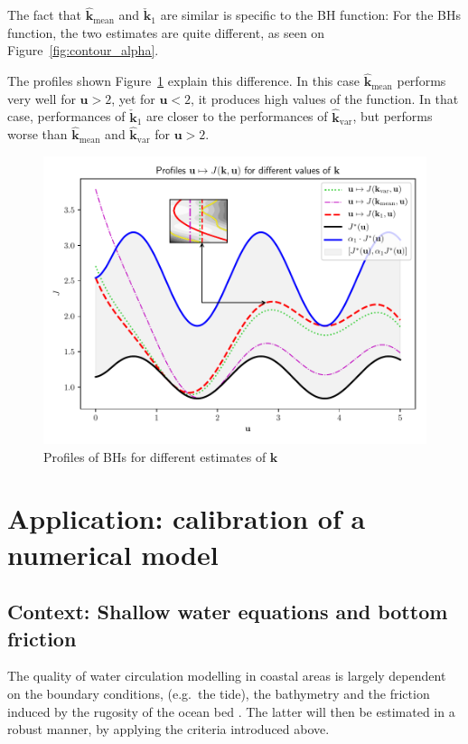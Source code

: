 \documentclass[npg, manuscript]{copernicus}
\begin{document}
The fact that $\hat{\mathbf{k}}_{\mathrm{mean}}$ and $\check{\mathbf{k}}_1$ are similar is specific to the BH function:
For the BHs function, the two estimates are quite different, as seen on Figure~\ref{fig:contour_alpha}.

The profiles shown Figure~\ref{fig:profiles_branin_switch} explain this difference. In this case $\hat{\mathbf{k}}_{\mathrm{mean}}$ performs very well for $\mathbf{u}>2$, yet for $\mathbf{u}<2$, it produces high values of the function. In that case, performances of $\check{\mathbf{k}}_1$ are closer to the performances of $\hat{\mathbf{k}}_{\mathrm{var}}$, but performs worse than $\hat{\mathbf{k}}_{\mathrm{mean}}$ and $\hat{\mathbf{k}}_{\mathrm{var}}$ for $\mathbf{u}>2$.

\begin{figure}[t]
\includegraphics[width=12cm]{Figures/profile_branin_switch.pdf}
\caption{Profiles of BHs for different estimates of $\mathbf{k}$}
\label{fig:profiles_branin_switch}
\end{figure}
\clearpage
\section{Application: calibration of a numerical model}
\label{sec:swe_application}
\subsection{Context: Shallow water equations and bottom friction}

The quality of water circulation modelling in coastal areas is largely dependent on the boundary conditions, (e.g.\ the tide), the bathymetry and the friction induced by the rugosity of the ocean bed \citep{boutet_estimation_2015}. The latter will then be estimated in a robust manner, by applying the criteria introduced above.
\end{document}
